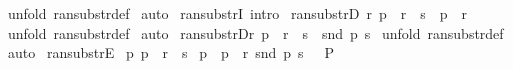 \begin{isabellebody}
%
\isatagproof
{}\isamarkupfalse%
\ {\isacharparenleft}unfold\ ran{\isacharunderscore}substr{\isacharunderscore}def{\isacharparenright}\isanewline
{}\isamarkupfalse%
\ auto\isanewline
{}\isamarkupfalse%
%
\endisatagproof
{\isafoldproof}%
%
\isadelimproof
\isanewline
%
\endisadelimproof
{}\isamarkupfalse%
\ ran{\isacharunderscore}substrI\ {\isacharbrackleft}intro{\isacharbang}{\isacharbrackright}\isanewline
\isanewline
{}\isamarkupfalse%
\ ran{\isacharunderscore}substrD{}{\isacharcolon}\ {\isachardoublequoteopen}{\isacharbang}{\isacharbang}r{\isachardot}\ p\ {\isacharcolon}\ {\isacharparenleft}r\ {\isacharcolon}{\isacharminus}{\isachargreater}\ s{\isacharparenright}\ {\isacharequal}{\isacharequal}{\isachargreater}\ p\ {\isacharcolon}\ r{\isachardoublequoteclose}\isanewline
%
\isadelimproof
%
\endisadelimproof
%
\isatagproof
{}\isamarkupfalse%
\ {\isacharparenleft}unfold\ ran{\isacharunderscore}substr{\isacharunderscore}def{\isacharparenright}\isanewline
{}\isamarkupfalse%
\ auto\isanewline
{}\isamarkupfalse%
%
\endisatagproof
{\isafoldproof}%
%
\isadelimproof
\isanewline
%
\endisadelimproof
\isanewline
\isanewline
{}\isamarkupfalse%
\ ran{\isacharunderscore}substrD{}{\isacharcolon}{\isachardoublequoteopen}{\isacharbang}{\isacharbang}r{\isachardot}\ p\ {\isacharcolon}\ {\isacharparenleft}r\ {\isacharcolon}{\isacharminus}{\isachargreater}\ s{\isacharparenright}\ {\isacharequal}{\isacharequal}{\isachargreater}\ snd\ p\ {\isachartilde}{\isacharcolon}s{\isachardoublequoteclose}\isanewline
%
\isadelimproof
%
\endisadelimproof
%
\isatagproof
{}\isamarkupfalse%
\ {\isacharparenleft}unfold\ ran{\isacharunderscore}substr{\isacharunderscore}def{\isacharparenright}\isanewline
{}\isamarkupfalse%
\ auto\isanewline
{}\isamarkupfalse%
%
\endisatagproof
{\isafoldproof}%
%
\isadelimproof
\isanewline
%
\endisadelimproof
\isanewline
\isanewline
{}\isamarkupfalse%
\ ran{\isacharunderscore}substrE{}{\isacharcolon}\isanewline
{}\ p{}{\isacharcolon}\ {\isachardoublequoteopen}p\ {\isacharcolon}\ {\isacharparenleft}r\ {\isacharcolon}{\isacharminus}{\isachargreater}\ s{\isacharparenright}{\isachardoublequoteclose}\isanewline
{}\ p{}{\isacharcolon}\ {\isachardoublequoteopen}{\isacharbrackleft}{\isacharbar}\ p\ {\isacharcolon}\ r{\isacharsemicolon}\ snd\ p\ {\isachartilde}{\isacharcolon}s\ {\isacharbar}{\isacharbrackright}\ {\isacharequal}{\isacharequal}{\isachargreater}\ P{\isachardoublequoteclose}\isanewline

\end{isabellebody}
